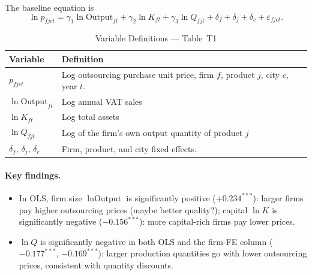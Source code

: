 \documentclass[12pt]{article}
\begin{document}
The baseline equation is
\begin{equation}
  \ln p_{fjct}
  = \gamma_1 \ln \text{Output}_{ft}
  + \gamma_2 \ln K_{ft}
  + \gamma_3 \ln Q_{fjt}
  + \delta_f + \delta_j + \delta_c
  + \varepsilon_{fjct}.
  \label{eq:t1}
\end{equation}

\begin{table}[H]
  \centering
  \caption{Variable Definitions --- Table~T1}
  \label{tab:vardef_t1}
  \begin{tabular}{L{3.5cm} L{10.5cm}}
    \toprule
    Variable & Definition \\
    \midrule
    \(p_{fjct}\) &
       Log outsourcing purchase unit price,
      firm \(f\), product \(j\), city \(c\), year \(t\). \\[4pt]
    \(\ln \text{Output}_{ft}\) &
      Log annual VAT sales\\[4pt]
    \(\ln K_{ft}\) &
      Log total assets
     \\[4pt]
    \(\ln Q_{fjt}\) &
      Log of the firm's own output quantity of product \(j\)\\[4pt]
    \(\delta_f,\,\delta_j,\,\delta_c\) &
      Firm, product, and city fixed effects. \\
    \bottomrule
  \end{tabular}
\end{table}

\paragraph{Key findings.}
\begin{itemize}[leftmargin=1.5em,nosep]
  \item In OLS, firm size \(\ln\text{Output}\) is significantly positive
    (\(+0.234^{***}\)): larger firms pay higher outsourcing prices (maybe better quality?); capital
    \(\ln K\) is significantly negative (\(-0.156^{***}\)): more capital-rich
    firms pay lower prices.
  \item \(\ln Q\) is significantly negative in both OLS and the firm-FE column
    (\(-0.177^{***}\), \(-0.169^{***}\)): larger production quantities go with
    lower outsourcing prices, consistent with quantity discounts.
\end{itemize}
\end{document}
